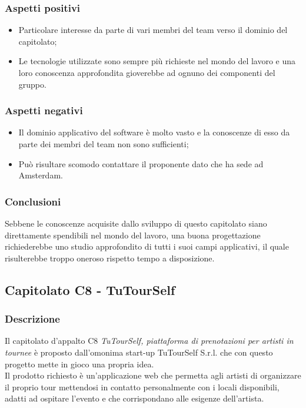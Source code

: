		\subsubsection{Aspetti positivi}
		\begin{itemize}
			\item Particolare interesse da parte di vari membri del team verso il dominio del capitolato;
			\item Le tecnologie utilizzate sono sempre più richieste nel mondo del lavoro e una loro conoscenza approfondita gioverebbe ad ognuno dei componenti del gruppo.
		\end{itemize}
		\subsubsection{Aspetti negativi}
		\begin{itemize}
			\item Il dominio applicativo del software è molto vasto e la conoscenze di esso da parte dei membri del team non sono sufficienti;
			\item Può risultare scomodo contattare il proponente dato che ha sede ad Amsterdam.
		\end{itemize}
		\subsubsection{Conclusioni}
		Sebbene le conoscenze acquisite dallo sviluppo di questo capitolato siano direttamente spendibili nel mondo del lavoro, una buona progettazione richiederebbe uno studio approfondito di tutti i suoi campi applicativi, il quale risulterebbe troppo oneroso rispetto tempo a disposizione.
	
	\subsection{Capitolato C8 - TuTourSelf}
		\subsubsection{Descrizione}
		Il capitolato d'appalto C8 \emph{TuTourSelf, piattaforma di prenotazioni per artisti in tournee} è proposto dall'omonima start-up TuTourSelf S.r.l. che con questo progetto mette in gioco una propria idea.\\ Il prodotto richiesto è un'applicazione web che permetta agli artisti di organizzare il proprio tour mettendosi in contatto personalmente con i locali disponibili, adatti ad ospitare l'evento e che corrispondano alle esigenze dell'artista. 
